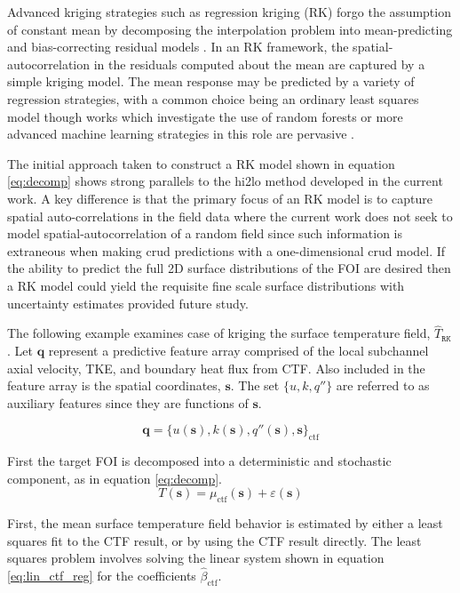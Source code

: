 Advanced kriging strategies such as regression kriging (RK) forgo the assumption of constant mean by decomposing the interpolation problem into mean-predicting and bias-correcting residual models \cite{Hengl07}.  In an RK framework, the spatial-autocorrelation in the residuals computed about the mean are captured by a simple kriging model.  The mean response may be predicted by a variety of regression strategies, with a common choice being an ordinary least squares model though works which investigate the use of random forests or more advanced machine learning strategies in this role are pervasive \cite{LI20111647} \cite{LI2017112}.

The initial approach taken to construct a RK model shown in equation \ref{eq:decomp} shows strong parallels to the hi2lo method developed in the current work.  A key difference is that the primary focus of an RK model is to capture spatial auto-correlations in the field data where the current work does not seek to model spatial-autocorrelation of a random field since such information is extraneous when making crud predictions with a one-dimensional crud model.   If the ability to predict the full 2D surface distributions of the FOI are desired then a RK model could yield the requisite fine scale surface distributions with uncertainty estimates provided future study.

The following example examines case of kriging the surface temperature field, $\hat T_\mathtt{RK}$.
Let $\mathbf{q}$ represent a predictive feature array comprised of the local subchannel axial velocity,
TKE, and boundary heat flux from CTF.  Also included in the feature array is the spatial coordinates, $\mathbf s$.  The set $\{u, k, q'' \}$ are referred to as auxiliary features since they are functions of $\mathbf s$.

\begin{equation}
\mathbf{q} = \{u(\mathbf s), k(\mathbf s), q''(\mathbf s), \mathbf s \}_{\mathrm{ctf}}
\end{equation}

First the target FOI is decomposed into a deterministic and stochastic component, as in equation \ref{eq:decomp}.
\begin{equation}
T(\mathbf s) = \mu_{\mathrm{ctf}}(\mathbf s) + \varepsilon(\mathbf s)
\label{eq:decomp}
\end{equation}

First, the mean surface temperature field behavior is estimated by either a least squares fit to the CTF result, or by using the CTF result directly.  The least squares problem involves solving the linear system shown in equation \ref{eq:lin_ctf_reg} for the coefficients $\hat{\beta}_{\mathrm{ctf}}$.

